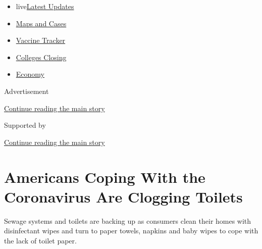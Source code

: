 \begin{itemize}
\tightlist
\item
  live\href{https://www.nytimes3xbfgragh.onion/2020/08/20/world/coronavirus-covid.html?name=styln-coronavirus-national\&region=TOP_BANNER\&variant=undefined\&block=storyline_menu_recirc\&action=click\&pgtype=Article\&impression_id=5941d4e1-e38a-11ea-918c-0f8207e68c04}{Latest
  Updates}
\item
  \href{https://www.nytimes3xbfgragh.onion/interactive/2020/us/coronavirus-us-cases.html?name=styln-coronavirus-national\&region=TOP_BANNER\&variant=undefined\&block=storyline_menu_recirc\&action=click\&pgtype=Article\&impression_id=5941fbf0-e38a-11ea-918c-0f8207e68c04}{Maps
  and Cases}
\item
  \href{https://www.nytimes3xbfgragh.onion/interactive/2020/science/coronavirus-vaccine-tracker.html?name=styln-coronavirus-national\&region=TOP_BANNER\&variant=undefined\&block=storyline_menu_recirc\&action=click\&pgtype=Article\&impression_id=5941fbf1-e38a-11ea-918c-0f8207e68c04}{Vaccine
  Tracker}
\item
  \href{https://www.nytimes3xbfgragh.onion/2020/08/19/us/colleges-closing-covid.html?name=styln-coronavirus-national\&region=TOP_BANNER\&variant=undefined\&block=storyline_menu_recirc\&action=click\&pgtype=Article\&impression_id=5941fbf2-e38a-11ea-918c-0f8207e68c04}{Colleges
  Closing}
\item
  \href{https://www.nytimes3xbfgragh.onion/live/2020/08/20/business/stock-market-today-coronavirus?name=styln-coronavirus-national\&region=TOP_BANNER\&variant=undefined\&block=storyline_menu_recirc\&action=click\&pgtype=Article\&impression_id=5941fbf3-e38a-11ea-918c-0f8207e68c04}{Economy}
\end{itemize}

Advertisement

\protect\hyperlink{after-top}{Continue reading the main story}

Supported by

\protect\hyperlink{after-sponsor}{Continue reading the main story}

\hypertarget{americans-coping-with-the-coronavirus-are-clogging-toilets}{%
\section{Americans Coping With the Coronavirus Are Clogging
Toilets}\label{americans-coping-with-the-coronavirus-are-clogging-toilets}}

Sewage systems and toilets are backing up as consumers clean their homes
with disinfectant wipes and turn to paper towels, napkins and baby wipes
to cope with the lack of toilet paper.


